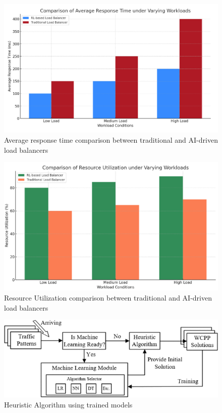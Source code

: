 \documentclass[conference]{IEEEtran}
\begin{document}
\begin{figure}
    \centering
    \includegraphics[width=.5\linewidth]{response_time.png}
    \caption{Average response time comparison between traditional and AI-driven load balancers}
    \label{fig:response}
\end{figure}

\begin{figure}
    \centering
    \includegraphics[width=.5\linewidth]{resource_utilization.png}
    \caption{Resource Utilization comparison between traditional and AI-driven load balancers}
    \label{fig:utilization}
\end{figure}

\begin{figure}
    \centering
    \includegraphics[width=.5\linewidth]{heuristics.png}
    \caption{Heuristic Algorithm using trained models}
    \label{fig:heuristic}
\end{figure}



\end{document}
